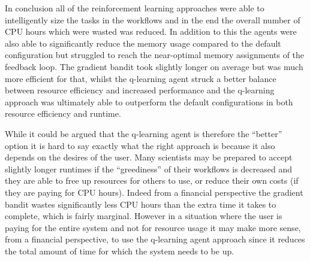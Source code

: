 In conclusion all of the reinforcement learning approaches were able to intelligently size the tasks in the workflows and in the end the overall number of CPU hours which were wasted was reduced. In addition to this the agents were also able to significantly reduce the memory usage compared to the default configuration but struggled to reach the near-optimal memory assignments of the feedback loop. The gradient bandit took slightly longer on average but was much more efficient for that, whilst the q-learning agent struck a better balance between resource efficiency and increased performance and the q-learning approach was ultimately able to outperform the default configurations in both resource efficiency and runtime.

While it could be argued that the q-learning agent is therefore the “better” option it is hard to say exactly what the right approach is because it also depends on the desires of the user. Many scientists may be prepared to accept slightly longer runtimes if the “greediness” of their workflows is decreased and they are able to free up resources for others to use, or reduce their own costs (if they are paying for CPU hours). Indeed from a financial perspective the gradient bandit wastes significantly less CPU hours than the extra time it takes to complete, which is fairly marginal. However in a situation where the user is paying for the entire system and not for resource usage it may make more sense, from a financial perspective, to use the q-learning agent approach since it reduces the total amount of time for which the system needs to be up.

